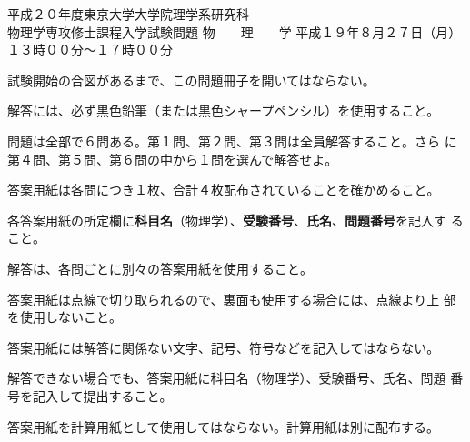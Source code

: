 \begin{inshicover}%
  {平成２０年度東京大学大学院理学系研究科\\物理学専攻修士課程入学試験問題}%
  {物　　理　　学}%
  {平成１９年８月２７日（月）　１３時００分〜１７時００分}
\item 試験開始の合図があるまで、この問題冊子を開いてはならない。
\item 解答には、必ず黒色鉛筆（または黒色シャープペンシル）を使用すること。
\item 問題は全部で６問ある。第１問、第２問、第３問は全員解答すること。さら
      に第４問、第５問、第６問の中から１問を選んで解答せよ。
\item 答案用紙は各問につき１枚、合計４枚配布されていることを確かめること。
\item 各答案用紙の所定欄に{\bf 科目名}（物理学）、{\bf 受験番号}、{\bf 氏名}、{\bf 問題番号}を記入す
      ること。
\item 解答は、各問ごとに別々の答案用紙を使用すること。
\item 答案用紙は点線で切り取られるので、裏面も使用する場合には、点線より上
      部を使用しないこと。
\item 答案用紙には解答に関係ない文字、記号、符号などを記入してはならない。
\item 解答できない場合でも、答案用紙に科目名（物理学）、受験番号、氏名、問題
      番号を記入して提出すること。
\item 答案用紙を計算用紙として使用してはならない。計算用紙は別に配布する。
\end{inshicover}
